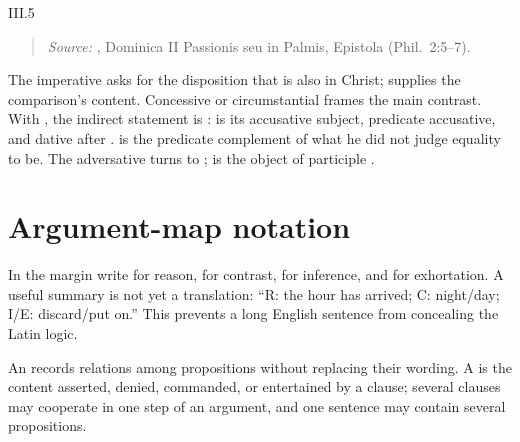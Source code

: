 \begin{courseunit}{III.5}
\begin{quote}
\emph{Source:} \Missal, Dominica II Passionis seu in Palmis, Epistola
(Phil.~2:5--7).
\end{quote}

The imperative  asks for the disposition that is also in Christ;
 supplies the comparison's content. Concessive or circumstantial
 frames the main contrast. With ,
the indirect statement is :  is its
accusative subject,  predicate accusative, and 
dative after .  is the predicate complement of
what he did not judge equality to be. The adversative  turns to
;  is the object of participle
.

\section{Argument-map notation}

In the margin write  for reason,  for contrast,  for
inference, and  for exhortation. A useful summary is not yet a
translation: ``R: the hour has arrived; C: night/day; I/E: discard/put on.''
This prevents a long English sentence from concealing the Latin logic.

An  records relations among propositions without replacing
their wording. A  is the content asserted, denied, commanded,
or entertained by a clause; several clauses may cooperate in one step of an
argument, and one sentence may contain several propositions.




\end{courseunit}

